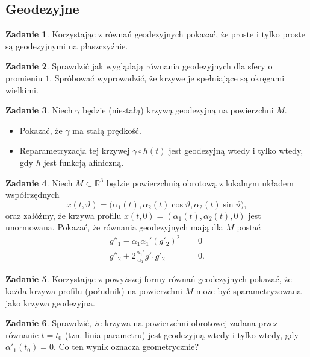 \documentclass[a4paper,11pt]{article}
\theoremstyle{definition}\newtheorem{exercise}{Zadanie}
\theoremstyle{definition}\newtheorem{remark}{Uwaga}
\begin{document}
\subsection{Geodezyjne}

\begin{exercise}
 Korzystając z r\'ownań geodezyjnych pokazać, że proste i tylko proste są 
geodezyjnymi na płaszczyźnie.
\end{exercise}

\begin{exercise}
 Sprawdzić jak wyglądają r\'ownania geodezyjnych dla sfery o promieniu $1$. 
Spr\'obować wyprowadzić, że krzywe je spełniające są okręgami wielkimi.
\end{exercise}



\begin{exercise}
Niech $\gamma$ będzie (niestałą) krzywą geodezyjną na powierzchni $M$. 
\begin{itemize}
 \item Pokazać, że $\gamma$ ma stałą prędkość.
 \item Reparametryzacja tej krzywej $\gamma\circ h (t)$ jest geodezyjną wtedy i 
tylko wtedy, gdy $h$ jest funkcją afiniczną. 
\end{itemize}

\end{exercise}

\begin{exercise}
Niech $M\subset \mathbb{R}^3$ będzie powierzchnią obrotową z lokalnym układem 
współrzędnych 
\[x(t,\vartheta)=\big(\alpha_1(t),\alpha_2(t)\cos \vartheta ,
\alpha_2(t)\sin\vartheta \big),\]
oraz załóżmy, że krzywa profilu $x(t,0)=(\alpha_1(t),\alpha_2(t),0)$ jest 
unormowana. Pokazać, że r\'ownania geodezyjnych mają dla $M$ postać
\begin{align*}
g''_1-\alpha_1\alpha_1'\left(g'_2\right)^2&=0\\
g''_2+2\frac{\alpha_1'}{\alpha_1}g'_1g'_2&=0.
\end{align*}
\end{exercise}

\begin{exercise}
Korzystając z powyższej formy r\'ownań geodezyjnych pokazać, że każda krzywa 
profilu (południk) na powierzchni $M$ może być sparametryzowana jako krzywa 
geodezyjna.
\end{exercise}

\begin{exercise}
Sprawdzić, że krzywa na powierzchni obrotowej zadana przez r\'ownanie 
$t=t_0$ (tzn. linia parametru) jest geodezyjną wtedy i tylko wtedy, gdy 
$\alpha'_1(t_0)=0$. Co ten wynik oznacza geometrycznie?

\end{exercise}
\end{document}
